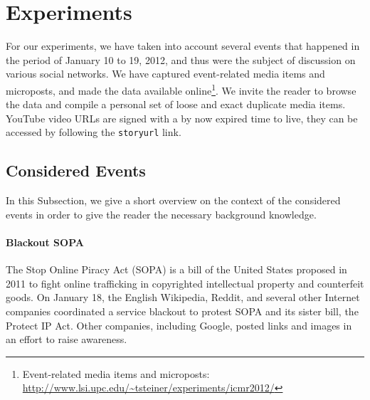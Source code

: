\documentclass{acm_proc_article-sp}
\newcommand{\inlinelistingsize}{\fontsize{8pt}{11pt}}
\let\oldurl\url
\renewcommand{\url}[1]{\inlinelistingsize\oldurl{#1}}
\begin{document}

\section{Experiments}
\label{sec:experiments}
For our experiments, we have taken into account several events that happened in the period of January 10 to 19, 2012, and thus were the subject of discussion on various social networks.
We have captured event-related media items and microposts, and made the data available online\footnote{Event-related media items and microposts: \url{http://www.lsi.upc.edu/~tsteiner/experiments/icmr2012/}}.
We invite the reader to browse the data and compile a personal set of loose and exact duplicate media items.
YouTube video URLs are signed with a by now expired time to live,
they can be accessed by following the \texttt{storyurl} link.

\subsection{Considered Events}
In this Subsection, we give a short overview on the context of the considered events in order to give the reader the necessary background knowledge.

\paragraph{Blackout SOPA}
The Stop Online Piracy Act (SOPA) is a bill of the United States proposed in 2011 to fight online trafficking in copyrighted intellectual property and counterfeit goods.
On January 18, the English Wikipedia, Reddit, and several other Internet companies coordinated a service blackout to protest SOPA and its sister bill, the Protect IP Act.
Other companies, including Google, posted links and images in an effort to raise awareness.
\end{document}

